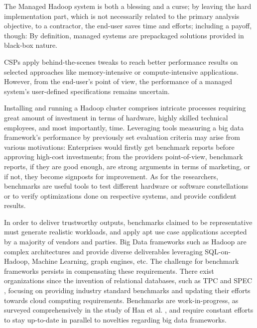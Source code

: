 \documentclass[review]{elsarticle}
\begin{document}
The Managed Hadoop system is both a blessing and a curse; by leaving the hard implementation part, which is not necessarily related to the primary analysis objective, to a contractor, the end-user saves time and efforts; including a payoff, though: By definition, managed systems are prepackaged solutions provided in black-box nature. 

CSPs apply behind-the-scenes tweaks to reach better performance results on selected approaches like memory-intensive or compute-intensive applications. However, from the end-user's point of view, the performance of a managed system's user-defined specifications remains uncertain.

Installing and running a Hadoop cluster comprises intricate processes requiring great amount of investment in terms of hardware, highly skilled technical employees, and most importantly, time. Leveraging tools measuring a big data framework’s performance by previously set evaluation criteria may arise from various motivations: Enterprises would firstly get benchmark reports before approving high-cost investments; from the providers point-of-view, benchmark reports, if they are good enough, are strong arguments in terms of marketing, or if not, they become signposts for improvement. As for the researchers, benchmarks are useful tools to test different hardware or software constellations or to verify optimizations done on respective systems, and provide confident results.

In order to deliver trustworthy outputs, benchmarks claimed to be representative must generate realistic workloads, and apply apt use case applications accepted by a majority of vendors and parties. Big Data frameworks such as Hadoop are  complex architectures and provide diverse deliverables leveraging SQL-on-Hadoop, Machine Learning, graph engines, etc. The challenge for benchmark frameworks persists in compensating these requirements. There exist organizations since the invention of relational databases, such as TPC \cite{tpc-history} and SPEC \cite{spec}, focusing on providing industry standard benchmarks and updating their efforts towards cloud computing requirements. Benchmarks are work-in-progress, as surveyed comprehensively in the study of Han et al. \cite{han_benchmarking_2018}, and require constant efforts to stay up-to-date in parallel to novelties regarding big data frameworks.
\end{document}
